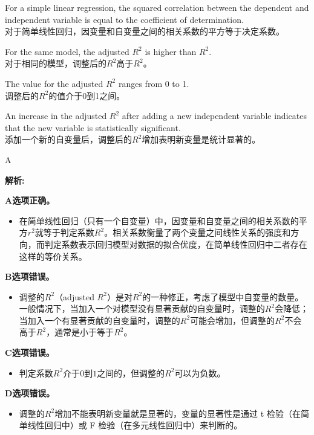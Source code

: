 \documentclass{article}
\newenvironment{explanation}
{\textbf{解析:}\par}
{\par}
\begin{document}
    \begin{choices}
        \item For a simple linear regression, the squared correlation between the dependent and independent variable is equal to the coefficient of determination.\\
        对于简单线性回归，因变量和自变量之间的相关系数的平方等于决定系数。
        \item For the same model, the adjusted \(R^{2}\) is higher than \(R^{2}\).\\
        对于相同的模型，调整后的\(R^{2}\)高于\(R^{2}\)。
        \item The value for the adjusted \(R^{2}\) ranges from 0 to 1.\\
        调整后的\(R^{2}\)的值介于0到1之间。
        \item An increase in the adjusted \(R^{2}\) after adding a new independent variable indicates that the new variable is statistically significant.\\
        添加一个新的自变量后，调整后的\(R^{2}\)增加表明新变量是统计显著的。
    \end{choices}
    
    \begin{correctanswer}
        A
    \end{correctanswer}
    
    \begin{explanation}
    \textbf{A选项正确。}
    \begin{itemize}
        \item 在简单线性回归（只有一个自变量）中，因变量和自变量之间的相关系数的平方\(r^{2}\)就等于判定系数\(R^{2}\)。相关系数衡量了两个变量之间线性关系的强度和方向，而判定系数表示回归模型对数据的拟合优度，在简单线性回归中二者存在这样的等价关系。
    \end{itemize}
    \textbf{B选项错误。}
    \begin{itemize}
        \item 调整的\(R^{2}\)（adjusted \(R^{2}\)）是对\(R^{2}\)的一种修正，考虑了模型中自变量的数量。一般情况下，当加入一个对模型没有显著贡献的自变量时，调整的\(R^{2}\)会降低；当加入一个有显著贡献的自变量时，调整的\(R^{2}\)可能会增加，但调整的\(R^{2}\)不会高于\(R^{2}\)，通常是小于等于\(R^{2}\)。
    \end{itemize}
    \textbf{C选项错误。}
    \begin{itemize}
        \item 判定系数\(R^{2}\)介于\(0\)到\(1\)之间的，但调整的\(R^{2}\)可以为负数。
    \end{itemize}
    \textbf{D选项错误。}
    \begin{itemize}
        \item 调整的\(R^{2}\)增加不能表明新变量就是显著的，变量的显著性是通过 t 检验（在简单线性回归中）或 F 检验（在多元线性回归中）来判断的。
    \end{itemize}
    \end{explanation}
    
\end{document}
